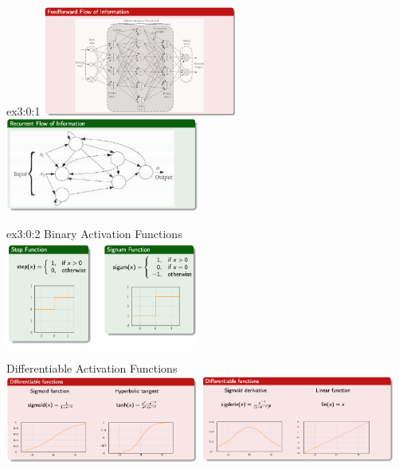 \documentclass{tron}
\begin{document}
\begin{example}{ex3:0:1}
	\includegraphics[width=240px]{Figs/Lec4/ff}
	\includegraphics[width=240px]{Figs/Lec4/rr}
\end{example}

\begin{example}{ex3:0:2}
	Binary Activation Functions\\
	\includegraphics[width=240px]{Figs/Lec4/bin_af}
	
	Differentiable Activation Functions\\
	\includegraphics[width=240px]{Figs/Lec4/diff_af}
	\includegraphics[width=240px]{Figs/Lec4/diff_af2}
\end{example}
\end{document}
